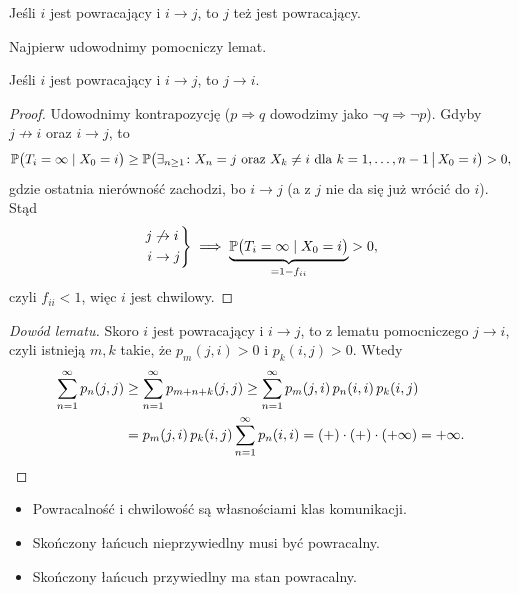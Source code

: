 \documentclass[dvipsnames]{book}
\begin{document}
\begin{lemat}
Jeśli $i$ jest powracający i $i \to j$, to $j$ też jest powracający.
\end{lemat}

Najpierw udowodnimy pomocniczy lemat.

\begin{lemat}
Jeśli $i$ jest powracający i $i \to j$, to $j \to i$.
\end{lemat}

\begin{proof}
Udowodnimy kontrapozycję ($p \Rightarrow q$ dowodzimy jako
$\neg q \Rightarrow \neg p$). Gdyby $j \not\to i$ oraz $i \to j$, to
\[
  \P\big(T_i = \infty \mid X_0 = i\big)
  \geq \P\big(\exists_{n \geq 1}\colon X_n = j \text{ oraz } X_k \neq i
    \text{ dla } k = 1, \ldots, n-1 \,\big|\, X_0 = i\big) > 0,
\]
gdzie ostatnia nierówność zachodzi, bo $i \to j$ (a z $j$ nie da się już wrócić
do $i$). Stąd
\[
  \left.\begin{aligned} j &\not\to i \\ i &\to j \end{aligned}\right\}
  \implies
  \underbrace{\P\big(T_i = \infty \mid X_0 = i\big)}_{= 1 - f_{ii}} > 0,
\]
czyli $f_{ii} < 1$, więc $i$ jest chwilowy.
\end{proof}

\begin{proof}[Dowód lematu]
Skoro $i$ jest powracający i $i \to j$, to z lematu pomocniczego $j \to i$,
czyli istnieją $m, k$ takie, że $p_m(j,i) > 0$ i $p_k(i,j) > 0$. Wtedy
\begin{align*}
  \sum_{n=1}^{\infty} p_n(j,j)
  &\geq \sum_{n=1}^{\infty} p_{m+n+k}(j,j)
   \geq \sum_{n=1}^{\infty} p_m(j,i)\, p_n(i,i)\, p_k(i,j) \\
  &= p_m(j,i)\, p_k(i,j) \sum_{n=1}^{\infty} p_n(i,i)
   = (+) \cdot (+) \cdot (+\infty) = +\infty. \qedhere
\end{align*}
\end{proof}

\begin{wniosek}
\begin{itemize}[topsep=0pt,itemsep=0pt]
  \item Powracalność i chwilowość są własnościami klas komunikacji.
  \item Skończony łańcuch nieprzywiedlny musi być powracalny.
  \item Skończony łańcuch przywiedlny ma stan powracalny.
\end{itemize}
\end{wniosek}
\end{document}
